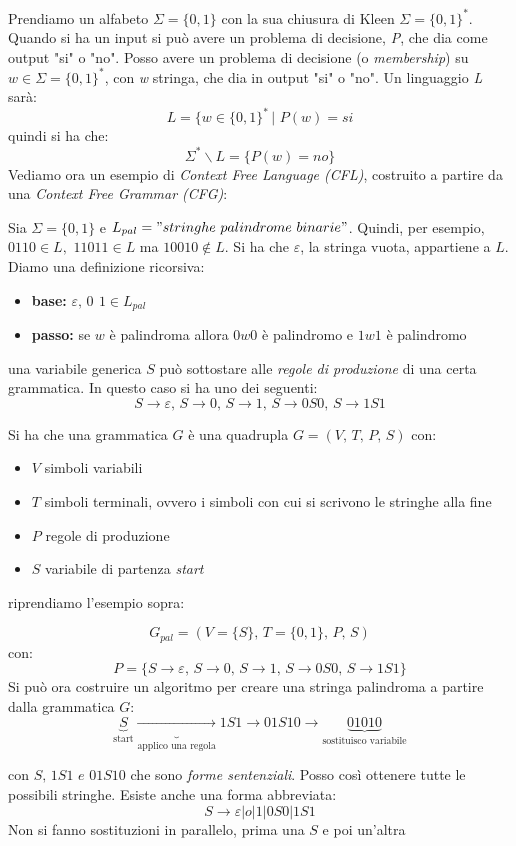 				Prendiamo un alfabeto $\Sigma=\{0, 1\}$ con la sua chiusura di Kleen $\Sigma=\{0, 1\}^*$. Quando si ha un input si può avere un problema di decisione, \textit{P}, che dia come output "si" o "no". Posso avere un problema di decisione (o \textit{membership}) su $w\in\Sigma=\{0, 1\}^*$, con \textit{w} stringa, che dia in output "si" o "no". Un linguaggio \textit{L} sarà:
$$L=\{w\in\{0, 1\}^*\,|\,\, P(w)=si$$
quindi si ha che:
$$\Sigma^*\backslash L=\{P(w)=no\}$$
Vediamo ora un esempio di \textit{Context Free Language (CFL)}, costruito a partire da una \textit{Context Free Grammar (CFG)}:
\begin{example}
	Sia $\Sigma=\{0, 1\}$ e $L_{pal}="stringhe\,\, palindrome\,\, binarie"$.
	Quindi, per esempio, $0110\in L,\,\, 11011\in L$ ma $10010\not\in L$. Si ha che $\varepsilon$, la stringa vuota, appartiene a $L$. Diamo una definizione ricorsiva:
	\begin{itemize}
		\item \textbf{base:} $\varepsilon,\, 0\,\ 1\in L_{pal}$
		\item \textbf{passo:} se $w$ è palindroma allora $0w0$ è palindromo e $1w1$ è palindromo
	\end{itemize}
	una variabile generica $S$ può sottostare alle \textit{regole di produzione} di una certa grammatica. In questo caso si ha uno dei seguenti:
	$$S\to\varepsilon,\, S\to 0,\, S\to 1,\, S\to 0S0,\, S\to 1S1$$
\end{example}
Si ha che una grammatica $G$ è una quadrupla $G=(V,\,T,\,P,\,S)$ con:
\begin{itemize}
	\item $V$ simboli variabili
	\item $T$ simboli terminali, ovvero i simboli con cui si scrivono le stringhe alla fine
	\item $P$ regole di produzione
	\item $S$ variabile di partenza \textit{start}
\end{itemize}
riprendiamo l'esempio sopra:
\begin{example}
	$$G_{pal}=(V=\{S\},\, T=\{0, 1\},\, P,\, S)$$
	con:
	$$P=\{S\to\varepsilon,\, S\to 0,\, S\to 1,\, S\to 0S0,\, S\to 1S1\}$$
	Si può ora costruire un algoritmo per creare una stringa palindroma a partire dalla grammatica $G$:
	$$\underbrace{S}_{\mbox{start}}\underbrace{\to}_{\mbox{applico una regola}} 1S1 \to 01S10\to \underbrace{01010}_{\mbox{sostituisco variabile}}$$

	con $S,\, 1S1\,\, e\,\, 01S10$ che sono \textit{forme sentenziali}. Posso così ottenere tutte le possibili stringhe. Esiste anche una forma abbreviata:
	$$S\to \varepsilon|o|1|0S0|1S1$$
	Non si fanno sostituzioni in parallelo, prima una $S$ e poi un'altra
\end{example}
